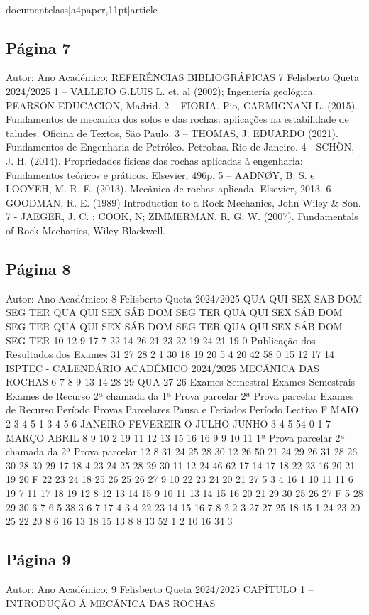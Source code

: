 \\documentclass[a4paper,11pt]{article}
\begin{document}
\subsection*{Página 7}
Autor:
Ano Académico:
REFERÊNCIAS BIBLIOGRÁFICAS
7
Felisberto Queta
2024/2025
1 – VALLEJO G.LUIS L. et. al (2002); Ingeniería geológica. PEARSON EDUCACION, Madrid.
2 – FIORIA. Pio, CARMIGNANI L. (2015). Fundamentos de mecanica dos solos e das rochas: 
aplicações na estabilidade de taludes. Oficina de Textos, São Paulo.
3 – THOMAS, J. EDUARDO (2021). Fundamentos de Engenharia de Petróleo. Petrobas. Rio de 
Janeiro.
4 - SCHÖN, J. H. (2014). Propriedades físicas das rochas aplicadas à engenharia: Fundamentos 
teóricos e práticos. Elsevier, 496p.
5 – AADNØY, B. S. e LOOYEH, M. R. E. (2013). Mecânica de rochas aplicada. Elsevier, 2013.
6 - GOODMAN, R. E. (1989) Introduction to a Rock Mechanics, John Wiley \& Son.
7 - JAEGER, J. C. ; COOK, N; ZIMMERMAN, R. G. W. (2007). Fundamentals of Rock Mechanics, 
Wiley-Blackwell.



\subsection*{Página 8}
Autor:
Ano Académico:
8
Felisberto Queta
2024/2025
QUA
QUI
SEX
SAB DOM SEG TER
QUA
QUI
SEX
SÁB DOM SEG TER
QUA
QUI
SEX
SÁB DOM SEG TER
QUA
QUI
SEX
SÁB DOM SEG TER
QUA
QUI
SEX
SÁB DOM SEG TER
10
12
9
17
7
22
14
26
21
23
22
19
24
21
19
0
Publicação dos Resultados dos 
Exames
31
27
28
2
1
30
18
19
20
5
4
20
42
58
0
15
12
17
14
ISPTEC - CALENDÁRIO  ACADÉMICO 2024/2025  MECÂNICA DAS ROCHAS
6
7
8
9
13
14
28
29
QUA
27
26
Exames Semestral
Exames Semestrais
Exames de Recurso
2ª chamada da 1ª Prova parcelar 
2ª Prova parcelar 
Exames de Recurso
Período Provas Parcelares
Pausa e Feriados
Período Lectivo
F
MAIO
2
3
4
5
1
3
4
5
6
JANEIRO
FEVEREIR
O
JULHO
JUNHO
3
4
5
54
0
1
7
MARÇO
ABRIL
8
9
10
2
19
11
12
13
15
16
16
9
9
10
11
1ª Prova parcelar 
2ª chamada da 2ª Prova parcelar 
12
8
31
24
25
28
30
12
26
50
21
24
29
26
31
28
26
30
28
30
29
17
18
4
23
24
25
28
29
30
11
12
24
46
62
17
14
17
18
22
23
16
20
21
19
20
F
22
23
24
18
25
26
25
26
27
9
10
22
23
24
20
21
27
5
3
4
16
1
10
11
11
6
19
7
11
17
18
19
12
8
12
13
14
15
9
10
11
13
14
15
16
20
21
29
30
25
26
27
F
5
28
29
30
6
7
6
5
38
3
6
7
17
4
3
4
22
23
14
15
16
7
8
2
2
3
27
27
25
18
15
1
24
23
20
25
22
20
8
6
16
13
18
15
13
8
8
13
52
1
2
10
16
34
3



\subsection*{Página 9}
Autor:
Ano Académico:
9
Felisberto Queta
2024/2025
CAPÍTULO 1 –
INTRODUÇÃO À MECÂNICA 
DAS ROCHAS
\end{document}
